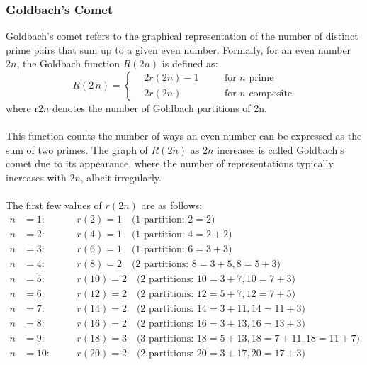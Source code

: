 \documentclass[a4paper, 12pt]{article}
\begin{document}
\subsubsection{Goldbach's Comet}
Goldbach's comet refers to the graphical representation of the number of distinct prime pairs that sum up to a given even number. Formally, for an even number \(2n\), the Goldbach function \(R(2n)\) is defined as:
\begin{equation}
R\left(2\,n\right)=\left\{
\begin{aligned}
& 2{r}(2n)-1\quad && \text{for } n \text{ prime}\\
& 2{r}(2n)\quad && \text{for } n \text{ composite}
\end{aligned}
\right.
\end{equation}
where r\(2n\) denotes the number of Goldbach partitions of 2n.
\\\\
This function counts the number of ways an even number can be expressed as the sum of two primes. The graph of \(R(2n)\) as \(2n\) increases is called Goldbach's comet due to its appearance, where the number of representations typically increases with \(2n\), albeit irregularly.
\\\\
The first few values of \( r(2n) \) are as follows:
\begin{align*}
n &= 1: \quad && r(2) = 1 \quad \text{(1 partition: } 2 = 2)\\
n &= 2: \quad && r(4) = 1 \quad \text{(1 partition: } 4 = 2 + 2)\\
n &= 3: \quad && r(6) = 1 \quad \text{(1 partition: } 6 = 3 + 3)\\
n &= 4: \quad && r(8) = 2 \quad \text{(2 partitions: } 8 = 3 + 5, 8 = 5 + 3)\\
n &= 5: \quad && r(10) = 2 \quad \text{(2 partitions: } 10 = 3 + 7, 10 = 7 + 3)\\
n &= 6: \quad && r(12) = 2 \quad \text{(2 partitions: } 12 = 5 + 7, 12 = 7 + 5)\\
n &= 7: \quad && r(14) = 2 \quad \text{(2 partitions: } 14 = 3 + 11, 14 = 11 + 3)\\
n &= 8: \quad && r(16) = 2 \quad \text{(2 partitions: } 16 = 3 + 13, 16 = 13 + 3)\\
n &= 9: \quad && r(18) = 3 \quad \text{(3 partitions: } 18 = 5 + 13, 18 = 7 + 11, 18 = 11 + 7)\\
n &= 10: \quad && r(20) = 2 \quad \text{(2 partitions: } 20 = 3 + 17, 20 = 17 + 3)
\end{align*}
\end{document}

